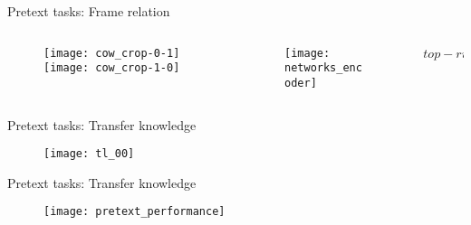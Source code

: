 \begin{frame}{Pretext tasks: Frame relation}

    \begin{columns}
    \begin{column}{0.33\textwidth}
      \begin{figure}
        \texttt{[image: cow\_crop-0-1]}\hspace{0.2mm}\texttt{[image: cow\_crop-1-0]}\\%
      \end{figure}
    \end{column}
    \begin{column}{0.43\textwidth}
      \begin{figure}
        \texttt{[image: networks\_encoder]}
      \end{figure}
    \end{column}
    \begin{column}{0.23\textwidth}
      \begin{align*}
        top-right
      \end{align*}
    \end{column}
  \end{columns}


\end{frame}


\begin{frame}{Pretext tasks: Transfer knowledge}

  \begin{figure}
    \texttt{[image: tl\_00]}
  \end{figure}


\end{frame}


\begin{frame}{Pretext tasks: Transfer knowledge}
  \begin{figure}
    \texttt{[image: pretext\_performance]}
  \end{figure}
\end{frame}

